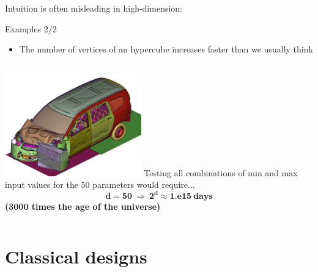\documentclass{beamer}
\begin{document}
\begin{frame}{}
Intuition is often misleading in high-dimension:
\begin{exampleblock}{Examples 2/2}
\begin{itemize}
	\item The number of vertices of an hypercube increases faster than we usually think
\end{itemize}	
\begin{columns}[c]
\column{5.5cm}
\includegraphics[height=4.5cm]{figures/crashtest} 
\column{5cm}
Testing all combinations of min and max input values for the 50 parameters would require... \pause
$$\mathbf{d=50 \ \Rightarrow \ 2^d \approx 1.e15 \ days}$$
\textbf{(3000 times the age of the universe)}\\
\end{columns}
\end{exampleblock}
\end{frame}

\section[Classical DoE]{Classical designs}
\subsection{}
\end{document}
